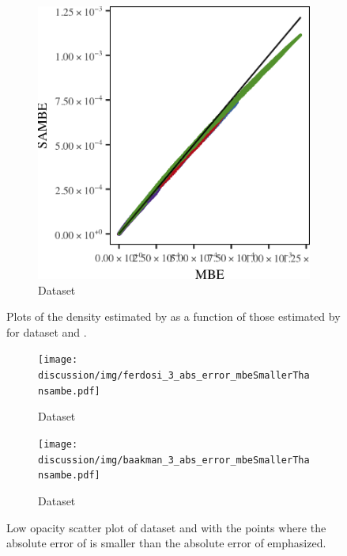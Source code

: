 \begin{figure}
\begin{subfigure}{0.23\textwidth}
			\includegraphics[keepaspectratio=true, width=\textwidth, height=0.23\textheight]{discussion/img/baakman_3_120000_mbe_sambe.png}
			\caption{Dataset \baakmanThree}
			\label{fig:discussion:multisphere:mbevssambe:baakman3}
		\end{subfigure}	
		\caption{Plots of the density estimated by \sambe as a function of those estimated by \mbe for dataset %
			\ferdosiTwo and %
			\baakmanTwo.
		}
		\label{fig:discussion:multisphere:four:mbevssambe}
	\end{figure}

	\begin{figure}
		\centering
		\begin{subfigure}{0.23\textwidth}
			\centering
			\texttt{[image: discussion/img/ferdosi\_3\_abs\_error\_mbeSmallerThansambe.pdf]}
			\caption{Dataset \ferdosiThree}
			\label{fig:discussion:multisphere:mbeLowerError:ferdosi3}
		\end{subfigure}
		\begin{subfigure}{0.23\textwidth}
			\centering
			\texttt{[image: discussion/img/baakman\_3\_abs\_error\_mbeSmallerThansambe.pdf]}
			\caption{Dataset \baakmanThree}
			\label{fig:discussion:multisphere:mbeLowerError:baakman3}
		\end{subfigure}	
		\caption{Low opacity scatter plot of dataset 			 %
			\ferdosiTwo and  \baakmanTwo with the points where the absolute error of \mbe is smaller than the absolute error of \sambe emphasized.
		}
		\label{fig:discussion:multisphere:four:mbeLowerError}
	\end{figure}	